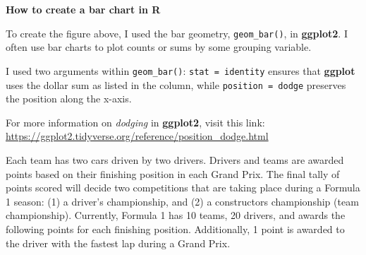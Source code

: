 \documentclass[
]{book}
\begin{document}
\begin{blackbox}

\begin{center}
\textbf{How to create a bar chart in R}

\end{center}

To create the figure above, I used the bar geometry, \texttt{geom\_bar()}, in \textbf{ggplot2}. I often use bar charts to plot counts or sums by some grouping variable.

I used two arguments within \texttt{geom\_bar()}: \texttt{stat\ =\ \textquotesingle{}identity\textquotesingle{}} ensures that \textbf{ggplot} uses the dollar sum as listed in the column, while \texttt{position\ =\ \textquotesingle{}dodge\textquotesingle{}} preserves the position along the x-axis.

For more information on \emph{dodging} in \textbf{ggplot2}, visit this link: \url{https://ggplot2.tidyverse.org/reference/position_dodge.html}

\end{blackbox}

Each team has two cars driven by two drivers. Drivers and teams are awarded points based on their finishing position in each Grand Prix. The final tally of points scored will decide two competitions that are taking place during a Formula 1 season: (1) a driver's championship, and (2) a constructors championship (team championship). Currently, Formula 1 has 10 teams, 20 drivers, and awards the following points for each finishing position. Additionally, 1 point is awarded to the driver with the fastest lap during a Grand Prix.
\end{document}
